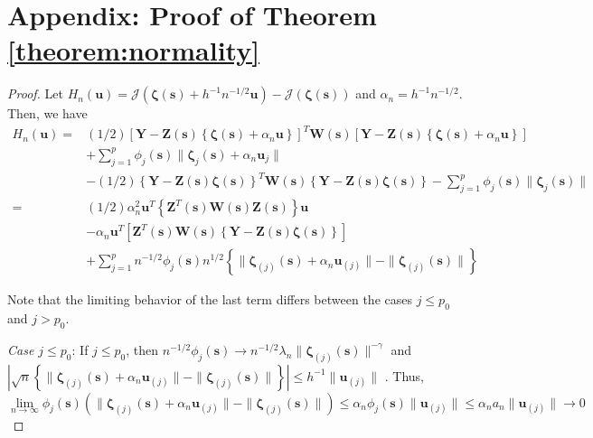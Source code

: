 \documentclass[authoryear,review, 12pt]{elsarticle}
\begin{document}
\section*{Appendix: Proof of Theorem \ref{theorem:normality}\label{sec:gaussian-normality-proof} }
\begin{proof}
Let $H_{n}(\bm{u})=\mathcal{J}\left(\bm{\zeta}\left(\bm{s}\right)+h^{-1}n^{-1/2}\bm{u}\right)-\mathcal{J}\left(\bm{\zeta}\left(\bm{s}\right)\right)$
and $\alpha_{n}=h^{-1}n^{-1/2}$. Then, we have 
\begin{align*}
H_{n}\left(\bm{u}\right)= & (1/2)\left[\bm{Y}-\bm{Z}(\bm{s})\left\{ \bm{\zeta}\left(\bm{s}\right)+\alpha_{n}\bm{u}\right\} \right]^{T}\bm{W}(\bm{s})\left[\bm{Y}-\bm{Z}(\bm{s})\left\{ \bm{\zeta}\left(\bm{s}\right)+\alpha_{n}\bm{u}\right\} \right]\\
 & +\sum_{j=1}^{p}\phi_{j}(\bm{s})\|\bm{\zeta}_{j}(\bm{s})+\alpha_{n}\bm{u}_{j}\|\\
 & -(1/2)\left\{ \bm{Y}-\bm{Z}(\bm{s})\bm{\zeta}(\bm{s})\right\} ^{T}\bm{W}(\bm{s})\left\{ \bm{Y}-\bm{Z}(\bm{s})\bm{\zeta}(\bm{s})\right\} -\sum_{j=1}^{p}\phi_{j}(\bm{s})\|\bm{\zeta}_{j}(\bm{s})\|\\
= & \left(1/2\right)\alpha_{n}^{2}\bm{u}^{T}\left\{ \bm{Z}^{T}(\bm{s})\bm{W}(\bm{s})\bm{Z}(\bm{s})\right\} \bm{u}\\
 & -\alpha_{n}\bm{u}^{T}\left[\bm{Z}^{T}(\bm{s})\bm{W}(\bm{s})\left\{ \bm{Y}-\bm{Z}(\bm{s})\bm{\zeta}(\bm{s})\right\} \right]\\
 & +\sum_{j=1}^{p}n^{-1/2}\phi_{j}(\bm{s})n^{1/2}\left\{ \|\bm{\zeta}_{\left(j\right)}(\bm{s})+\alpha_{n}\bm{u}_{\left(j\right)}\|-\|\bm{\zeta}_{\left(j\right)}(\bm{s})\|\right\} 
\end{align*}


Note that the limiting behavior of the last term differs between the
cases $j\le p_{0}$ and $j>p_{0}$.

\emph{Case $j\le p_{0}$}: If $j\le p_{0}$, then $n^{-1/2}\phi_{j}(\bm{s})\to n^{-1/2}\lambda_{n}\|\bm{\zeta}_{\left(j\right)}(\bm{s})\|^{-\gamma}$
and $|\sqrt{n}\left\{ \|\bm{\zeta}_{\left(j\right)}(\bm{s})+\alpha_{n}\bm{u}_{\left(j\right)}\|-\|\bm{\zeta}_{\left(j\right)}(\bm{s})\|\right\} |\le h^{-1}\|\bm{u}_{\left(j\right)}\|$
. Thus, 
\[
\lim\limits _{n\to\infty}\phi_{j}(\bm{s})\left(\|\bm{\zeta}_{\left(j\right)}(\bm{s})+\alpha_{n}\bm{u}_{\left(j\right)}\|-\|\bm{\zeta}_{\left(j\right)}(\bm{s})\|\right)\le\alpha_{n}\phi_{j}(\bm{s})\|\bm{u}_{\left(j\right)}\|\le\alpha_{n}a_{n}\|\bm{u}_{\left(j\right)}\|\to0
\]



\end{proof}
\end{document}
